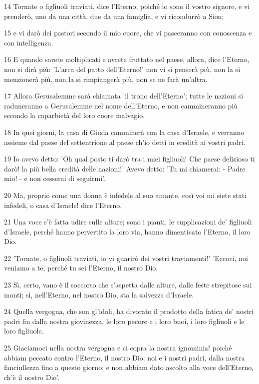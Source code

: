 \par 14 Tornate o figliuoli traviati, dice l'Eterno, poiché io sono il vostro signore, e vi prenderò, uno da una città, due da una famiglia, e vi ricondurrò a Sion;
\par 15 e vi darò dei pastori secondo il mio cuore, che vi pasceranno con conoscenza e con intelligenza.
\par 16 E quando sarete moltiplicati e avrete fruttato nel paese, allora, dice l'Eterno, non si dirà più: 'L'arca del patto dell'Eterno!' non vi si penserà più, non la si menzionerà più, non la si rimpiangerà più, non se ne farà un'altra.
\par 17 Allora Gerusalemme sarà chiamata 'il trono dell'Eterno'; tutte le nazioni si raduneranno a Gerusalemme nel nome dell'Eterno, e non cammineranno più secondo la caparbietà del loro cuore malvagio.
\par 18 In quei giorni, la casa di Giuda camminerà con la casa d'Israele, e verranno assieme dal paese del settentrione al paese ch'io detti in eredità ai vostri padri.
\par 19 Io avevo detto: 'Oh qual posto ti darò tra i miei figliuoli! Che paese delizioso ti darò! la più bella eredità delle nazioni!' Avevo detto: 'Tu mi chiamerai: - Padre mio! - e non cesserai di seguirmi'.
\par 20 Ma, proprio come una donna è infedele al suo amante, così voi mi siete stati infedeli, o casa d'Israele! dice l'Eterno.
\par 21 Una voce s'è fatta udire sulle alture; sono i pianti, le supplicazioni de' figliuoli d'Israele, perché hanno pervertito la loro via, hanno dimenticato l'Eterno, il loro Dio.
\par 22 'Tornate, o figliuoli traviati, io vi guarirò dei vostri traviamenti!' 'Eccoci, noi veniamo a te, perché tu sei l'Eterno, il nostro Dio.
\par 23 Sì, certo, vano è il soccorso che s'aspetta dalle alture, dalle feste strepitose sui monti; sì, nell'Eterno, nel nostro Dio, sta la salvezza d'Israele.
\par 24 Quella vergogna, che son gl'idoli, ha divorato il prodotto della fatica de' nostri padri fin dalla nostra giovinezza, le loro pecore e i loro buoi, i loro figliuoli e le loro figliuole.
\par 25 Giaciamoci nella nostra vergogna e ci copra la nostra ignominia! poiché abbiam peccato contro l'Eterno, il nostro Dio: noi e i nostri padri, dalla nostra fanciullezza fino a questo giorno; e non abbiam dato ascolto alla voce dell'Eterno, ch'è il nostro Dio'.

